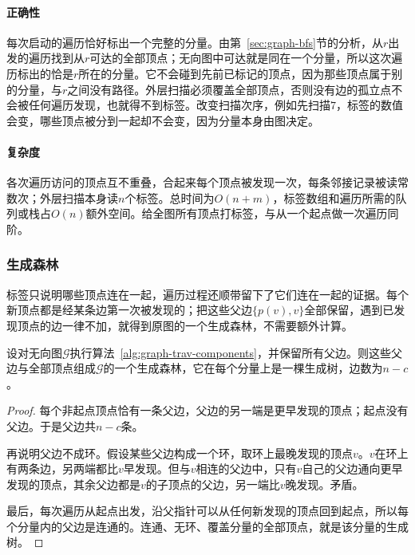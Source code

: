 \paragraph{正确性}
每次启动的遍历恰好标出一个完整的分量。由第~\ref{sec:graph-bfs}节的分析，从$r$出发的遍历找到从$r$可达的全部顶点；无向图中可达就是同在一个分量，所以这次遍历标出的恰是$r$所在的分量。它不会碰到先前已标记的顶点，因为那些顶点属于别的分量，与$r$之间没有路径。外层扫描必须覆盖全部顶点，否则没有边的孤立点不会被任何遍历发现，也就得不到标签。改变扫描次序，例如先扫描$7$，标签的数值会变，哪些顶点被分到一起却不会变，因为分量本身由图决定。

\paragraph{复杂度}
各次遍历访问的顶点互不重叠，合起来每个顶点被发现一次，每条邻接记录被读常数次；外层扫描本身读$n$个标签。总时间为$O(n+m)$，标签数组和遍历所需的队列或栈占$O(n)$额外空间。给全图所有顶点打标签，与从一个起点做一次遍历同阶。

\subsubsection{生成森林}
\label{sec:graph-trav-spanning-forest}

标签只说明哪些顶点连在一起，遍历过程还顺带留下了它们连在一起的证据。每个新顶点都是经某条边第一次被发现的；把这些父边$\{p(v),v\}$全部保留，遇到已发现顶点的边一律不加，就得到原图的一个生成森林，不需要额外计算。

\begin{theorem}[发现父边构成生成森林]
\label{thm:graph-trav-parent-forest}
设对无向图$\mathcal G$执行算法~\ref{alg:graph-trav-components}，并保留所有父边。则这些父边与全部顶点组成$\mathcal G$的一个生成森林，它在每个分量上是一棵生成树，边数为$n-c$。
\end{theorem}

\begin{proof}
每个非起点顶点恰有一条父边，父边的另一端是更早发现的顶点；起点没有父边。于是父边共$n-c$条。

再说明父边不成环。假设某些父边构成一个环，取环上最晚发现的顶点$v$。$v$在环上有两条边，另两端都比$v$早发现。但与$v$相连的父边中，只有$v$自己的父边通向更早发现的顶点，其余父边都是$v$的子顶点的父边，另一端比$v$晚发现。矛盾。

最后，每次遍历从起点出发，沿父指针可以从任何新发现的顶点回到起点，所以每个分量内的父边是连通的。连通、无环、覆盖分量的全部顶点，就是该分量的生成树。
\end{proof}

